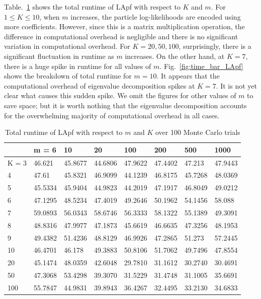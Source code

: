 \documentclass[10pt,letterpaper,final]{article}
\begin{document}
Table.~\ref{tab:runtime_LApf} shows the total runtime of LApf with respect to $K$ and $m$. For $1\leq K \leq 10$, when $m$ increases, the particle log-likelihoods are encoded using more coefficients. However, since this is a matrix multiplication operation, the difference in computational overhead is negligible and there is no significant variation in computational overhead. For $K=20, 50, 100$, surprisingly, there is a significant fluctuation in runtime as $m$ increases. On the other hand, at $K=7$, there is a huge spike in runtime for all values of $m$. Fig.~\ref{fig:time_bar_LApf} shows the breakdown of total runtime for $m=10$. It appears that the computational overhead of eigenvalue decomposition spikes at $K=7$. It is not yet clear what causes this sudden spike. We omit the figures for other values of $m$ to save space; but it is worth nothing that the eigenvalue decomposition accounts for the overwhelming majority of computational overhead in all cases. 

\begin{table}[h!]
\centering
\begin{tabular}{|l|l|l|l|l|l|l|l|}
\hline
      & m = 6   & 10      & 20      & 100     & 200     & 500     & 1000    \\ \hline
K = 3 & 46.621  & 45.8677 & 44.6806 & 47.9622 & 47.4402 & 47.213  & 47.9443 \\ \hline
4     & 47.61   & 45.8321 & 46.9099 & 44.1239 & 46.8175 & 45.7268 & 48.0369 \\ \hline
5     & 45.5334 & 45.9404 & 44.9823 & 44.2019 & 47.1917 & 46.8049 & 49.0212 \\ \hline
6     & 47.1295 & 48.5234 & 47.4019 & 49.2646 & 50.1962 & 54.1456 & 58.088  \\ \hline
7     & 59.0893 & 56.0343 & 58.6746 & 56.3333 & 58.1322 & 55.1389 & 49.3091 \\ \hline
8     & 48.8316 & 47.9977 & 47.1873 & 45.6619 & 46.6635 & 47.3256 & 48.1953 \\ \hline
9     & 49.4382 & 51.4236 & 48.8129 & 46.9926 & 47.2865 & 51.273  & 57.2445 \\ \hline
10    & 46.4701 & 46.178  & 49.3883 & 50.8106 & 51.7062 & 49.7496 & 47.8554 \\ \hline
20    & 45.1474 & 48.0359 & 42.6048 & 29.7810 & 31.1612 & 30.2740 & 30.4691 \\ \hline
50    & 47.3068 & 53.4298 & 39.3070 & 31.5229 & 31.4748 & 31.1005 & 35.6691 \\ \hline
100   & 55.7847 & 44.9831 & 39.8943 & 36.4267 & 32.4495 & 33.2130 & 34.6833 \\ \hline
\end{tabular}
\caption{Total runtime of LApf with respect to $m$ and $K$ over 100 Monte Carlo trials}
\label{tab:runtime_LApf}
\end{table}
\end{document}
